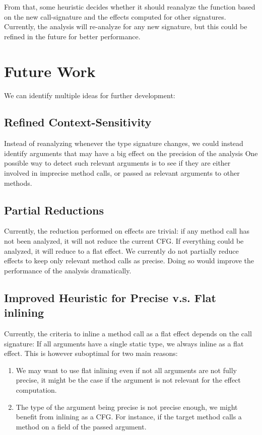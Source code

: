 \documentclass[a4paper]{article}
\begin{document}
From that, some heuristic decides whether it should reanalyze the function
based on the new call-signature and the effects computed for other signatures.
Currently, the analysis will re-analyze for any new signature, but this could
be refined in the future for better performance.

\section{Future Work}
We can identify multiple ideas for further development:

\subsection{Refined Context-Sensitivity}
Instead of reanalyzing whenever the type signature changes, we could instead
identify arguments that may have a big effect on the precision of the analysis
One possible way to detect such relevant arguments is to see if they are either
involved in imprecise method calls, or passed as relevant arguments to other
methods.

\subsection{Partial Reductions}
Currently, the reduction performed on effects are trivial: if any method call
has not been analyzed, it will not reduce the current CFG. If everything could
be analyzed, it will reduce to a flat effect. We currently do not partially
reduce effects to keep only relevant method calls as precise. Doing so would
improve the performance of the analysis dramatically.

\subsection{Improved Heuristic for Precise v.s. Flat inlining}
Currently, the criteria to inline a method call as a flat effect depends on the
call signature: If all arguments have a single static type, we always inline as
a flat effect. This is however suboptimal for two main reasons:
\begin{enumerate}
    \item We may want to use flat inlining even if not all arguments are not fully
precise, it might be the case if the argument is not relevant for the effect
computation.
    \item The type of the argument being precise is not precise enough, we might
benefit from inlining as a CFG. For instance, if the target method calls a
method on a field of the passed argument.
\end{enumerate}
\end{document}
